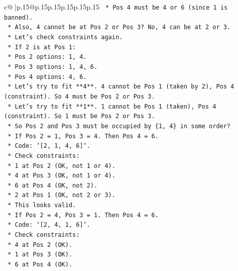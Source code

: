 \documentclass{article}
\begin{document}
{\begin{supertabular}{c@{$\;$}|p{.15\linewidth}@{}p{.15\linewidth}p{.15\linewidth}p{.15\linewidth}p{.15\linewidth}p{.15\linewidth}}
{{{\texttt{            *   Pos 4 must be 4 or 6 (since 1 is banned).} \\
\texttt{            *   Also, 4 cannot be at Pos 2 or Pos 3? No, 4 can be at 2 or 3.} \\
\texttt{            *   Let's check constraints again.} \\
\texttt{            *   If 2 is at Pos 1:} \\
\texttt{                *   Pos 2 options: 1, 4.} \\
\texttt{                *   Pos 3 options: 1, 4, 6.} \\
\texttt{                *   Pos 4 options: 4, 6.} \\
\texttt{            *   Let's try to fit **4**. 4 cannot be Pos 1 (taken by 2), Pos 4 (constraint). So 4 must be Pos 2 or Pos 3.} \\
\texttt{            *   Let's try to fit **1**. 1 cannot be Pos 1 (taken), Pos 4 (constraint). So 1 must be Pos 2 or Pos 3.} \\
\texttt{            *   So Pos 2 and Pos 3 must be occupied by \{1, 4\} in some order?} \\
\texttt{                *   If Pos 2 = 1, Pos 3 = 4. Then Pos 4 = 6.} \\
\texttt{                    *   Code: `{[}2, 1, 4, 6{]}`.} \\
\texttt{                    *   Check constraints:} \\
\texttt{                        *   1 at Pos 2 (OK, not 1 or 4).} \\
\texttt{                        *   4 at Pos 3 (OK, not 1 or 4).} \\
\texttt{                        *   6 at Pos 4 (OK, not 2).} \\
\texttt{                        *   2 at Pos 1 (OK, not 2 or 3).} \\
\texttt{                    *   This looks valid.} \\
\texttt{                *   If Pos 2 = 4, Pos 3 = 1. Then Pos 4 = 6.} \\
\texttt{                    *   Code: `{[}2, 4, 1, 6{]}`.} \\
\texttt{                    *   Check constraints:} \\
\texttt{                        *   4 at Pos 2 (OK).} \\
\texttt{                        *   1 at Pos 3 (OK).} \\
\texttt{                        *   6 at Pos 4 (OK).} \\
}}}
\end{supertabular}}
\end{document}

